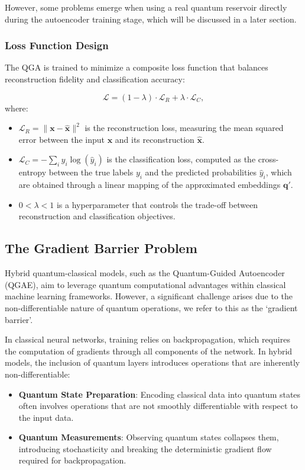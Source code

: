 \documentclass[conference]{IEEEtran}
\begin{document}
However, some problems emerge when using a real quantum reservoir directly during the autoencoder training stage, which will be discussed in a later section.

\subsubsection{Loss Function Design}
The QGA is trained to minimize a composite loss 
function that balances reconstruction fidelity and 
classification accuracy:

\begin{equation}
    \mathcal{L} = (1-\lambda) \cdot \mathcal{L}_R + \lambda \cdot \mathcal{L}_{C},
    \label{eq:composed_loss_function}
\end{equation}
where:
\begin{itemize}
    \item \( \mathcal{L}_R = \| \bm{x} - \hat{\bm{x}} \|^2 \) is the reconstruction loss, measuring the mean squared error between the input \( \bm{x} \) and its reconstruction \( \bm{\hat{x}} \).
    \item \( \mathcal{L}_C = -\sum_i y_i \log(\hat{y}_i) \) is the classification loss, computed as the cross-entropy between the true labels \( y_i \) and the predicted probabilities \( \hat{y}_i \), which are obtained through a linear mapping of the 
    approximated embeddings \(\bm{q}'\).
    \item \( 0 < \lambda < 1 \) is a hyperparameter that controls the trade-off between reconstruction and classification objectives.
\end{itemize}    
\subsection{The Gradient Barrier Problem}
Hybrid quantum-classical models, such as the Quantum-Guided Autoencoder (QGAE), aim to leverage quantum computational advantages within classical machine learning frameworks. However, a significant challenge arises due to the non-differentiable nature of quantum 
operations, we refer to this as the `gradient barrier'.

In classical neural networks, training relies on backpropagation, 
which requires the computation of gradients through all components 
of the network. In hybrid models, the inclusion of quantum 
layers introduces operations that are inherently non-differentiable:

\begin{itemize}
    \item \textbf{Quantum State Preparation}: 
    Encoding classical data into 
    quantum states often involves operations 
    that are not smoothly differentiable with 
    respect to the input data.
    
    \item \textbf{Quantum Measurements}:
    Observing quantum states collapses them, 
    introducing stochasticity and breaking the 
    deterministic gradient flow required 
    for backpropagation.
\end{itemize}
\end{document}
